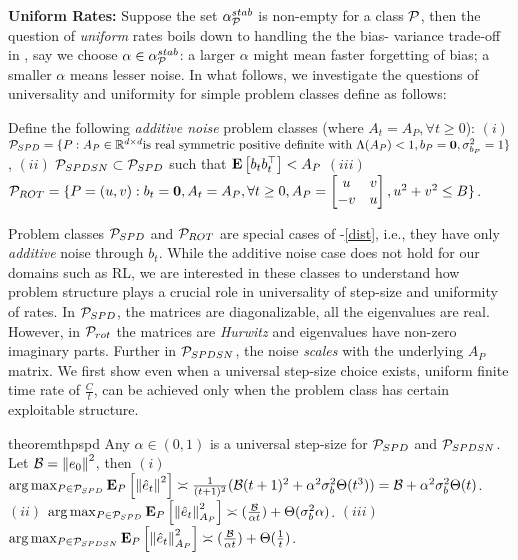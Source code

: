 \textbf{Uniform Rates:} Suppose the set $\alpha^{stab}_{\P}$ is non-empty for a class $\P$, then the question of \emph{uniform} rates boils down to handling the the bias-
variance trade-off in , say we choose $\alpha\in\alpha^{stab}_{\P}$: a larger $\alpha$ might mean faster forgetting of bias; a smaller $\alpha$ means lesser noise. In what follows, we investigate the questions of universality and uniformity for simple problem classes define as follows:
\begin{definition}
Define the following \emph{additive noise} problem classes (where $A_t=A_P,\forall t\geq 0$): $(i)$  $\P_{SPD}=\{ P: A_P\in \R^{\dcd}\text{is real symmetric positive definite with~} \Lambda(A_P)<1, b_P=\mathbf{0}, \sigma^2_{b_P}=1\}$, $(ii)$ $\P_{SPDSN}\subset \P_{SPD}$ such that $\EE{b_tb_t^\top}<A_P$ $(iii)$ $\P_{ROT}=\{P=(u,v): b_t=\mathbf{0}, A_t=A_P, \forall t\geq 0, A_P=\left[\begin{matrix} u &v \\ -v & u\end{matrix}\right], u^2+v^2\leq B\}$.
\end{definition}
Problem classes $\P_{SPD}$ and $\P_{ROT}$ are special cases of -\eqref{dist}, i.e., they have only \emph{additive} noise through $b_t$. While the additive noise case does not hold for our domains such as RL, we are interested in these classes to understand how problem structure plays a crucial role in universality of step-size and uniformity of rates. In $\P_{SPD}$, the matrices are diagonalizable, all the eigenvalues are real. However, in $\P_{rot}$ the matrices are \emph{Hurwitz} and eigenvalues have non-zero imaginary parts. Further in $\P_{SPDSN}$, the noise \emph{scales} with the underlying $A_P$ matrix. 
We first show even when a universal step-size choice exists, uniform finite time rate of $\frac{C}{t}$, can be achieved only when the problem class has certain exploitable structure.
\begin{restatable}{theorem}{thpspd}\label{th:pspd}
Any $\alpha\in(0,1)$ is a universal step-size for $\P_{SPD}$ and $\P_{SPDSN}$. Let $\B=\norm{e_0}^2$, then $(i)$  $\arg\max_{P\in \P_{SPD}}\eep{\norm{\eh_t}^2}{P}\asymp\frac{1}{(t+1)^2}(\B (t+1)^2+ \alpha^2\sigma_b^2 \Theta(t^3))=\B+\alpha^2\sigma_b^2 \Theta(t)$. $(ii)$ $\arg\max_{P\in \P_{SPD}}\eep{\norm{\eh_t}^2_{A_P}}{P} \asymp (\frac{\B}{\alpha t})+\Theta(\sigma^2_b\alpha)$. $(iii)$ $\arg\max_{P\in\P_{SPDSN}}\eep{\norm{\eh_t}^2_{A_P}}{P}\asymp (\frac{\B}{\alpha t})+\Theta(\frac{1}{t})$.
\end{restatable}
